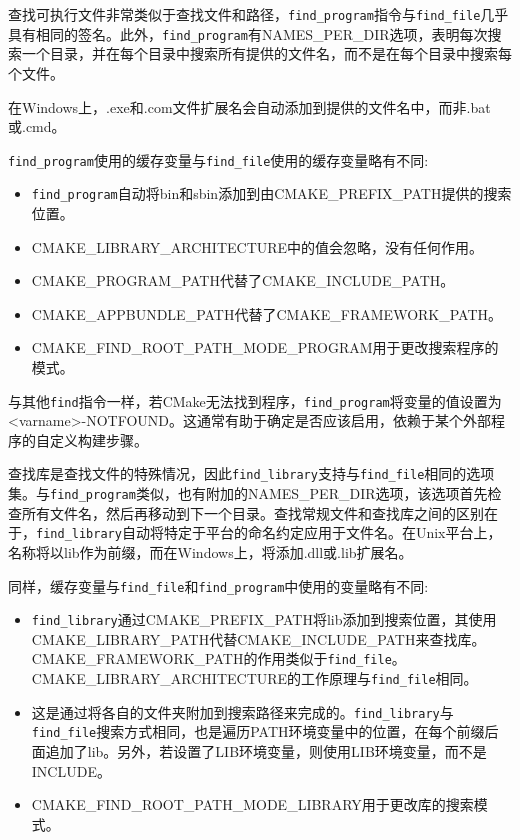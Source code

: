 查找可执行文件非常类似于查找文件和路径，\texttt{find\_program}指令与\texttt{find\_file}几乎具有相同的签名。此外，\texttt{find\_program}有NAMES\_PER\_DIR选项，表明每次搜索一个目录，并在每个目录中搜索所有提供的文件名，而不是在每个目录中搜索每个文件。

在Windows上，.exe和.com文件扩展名会自动添加到提供的文件名中，而非.bat或.cmd。

\texttt{find\_program}使用的缓存变量与\texttt{find\_file}使用的缓存变量略有不同:

\begin{itemize}
\item 
\texttt{find\_program}自动将bin和sbin添加到由CMAKE\_PREFIX\_PATH提供的搜索位置。

\item 
CMAKE\_LIBRARY\_ARCHITECTURE中的值会忽略，没有任何作用。

\item 
CMAKE\_PROGRAM\_PATH代替了CMAKE\_INCLUDE\_PATH。

\item 
CMAKE\_APPBUNDLE\_PATH代替了CMAKE\_FRAMEWORK\_PATH。

\item 
CMAKE\_FIND\_ROOT\_PATH\_MODE\_PROGRAM用于更改搜索程序的模式。
\end{itemize}

与其他\texttt{find}指令一样，若CMake无法找到程序，\texttt{find\_program}将变量的值设置为<varname>-NOTFOUND。这通常有助于确定是否应该启用，依赖于某个外部程序的自定义构建步骤。


查找库是查找文件的特殊情况，因此\texttt{find\_library}支持与\texttt{find\_file}相同的选项集。与\texttt{find\_program}类似，也有附加的NAMES\_PER\_DIR选项，该选项首先检查所有文件名，然后再移动到下一个目录。查找常规文件和查找库之间的区别在于，\texttt{find\_library}自动将特定于平台的命名约定应用于文件名。在Unix平台上，名称将以lib作为前缀，而在Windows上，将添加.dll或.lib扩展名。

同样，缓存变量与\texttt{find\_file}和\texttt{find\_program}中使用的变量略有不同:

\begin{itemize}
\item 
\texttt{find\_library}通过CMAKE\_PREFIX\_PATH将lib添加到搜索位置，其使用CMAKE\_LIBRARY\_PATH代替CMAKE\_INCLUDE\_PATH来查找库。CMAKE\_FRAMEWORK\_PATH的作用类似于\texttt{find\_file}。CMAKE\_LIBRARY\_ARCHITECTURE的工作原理与\texttt{find\_file}相同。

\item 
这是通过将各自的文件夹附加到搜索路径来完成的。\texttt{find\_library}与\texttt{find\_file}搜索方式相同，也是遍历PATH环境变量中的位置，在每个前缀后面追加了lib。另外，若设置了LIB环境变量，则使用LIB环境变量，而不是INCLUDE。

\item 
CMAKE\_FIND\_ROOT\_PATH\_MODE\_LIBRARY用于更改库的搜索模式。
\end{itemize}

